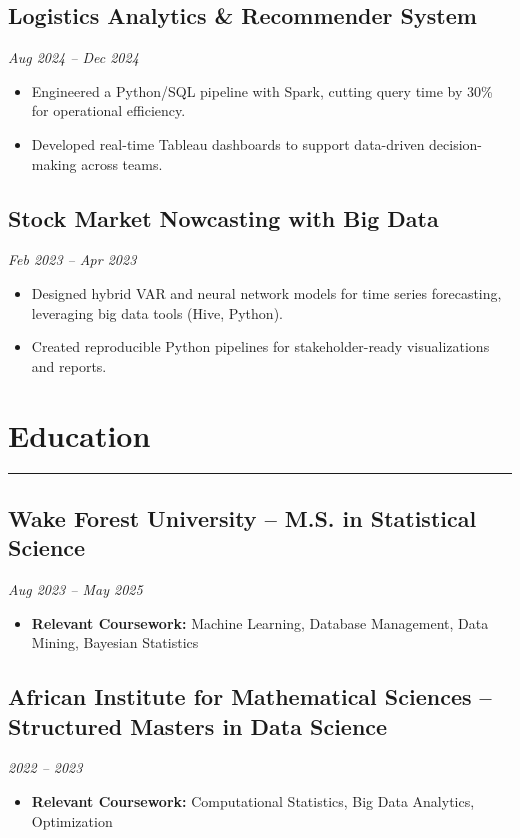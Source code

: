 \documentclass[a4paper,11pt]{article}
\begin{document}
\subsection*{Logistics Analytics \& Recommender System}
\textit{Aug 2024 – Dec 2024}
\begin{itemize}
    \item Engineered a Python/SQL pipeline with Spark, cutting query time by 30\% for operational efficiency.
    \item Developed real-time Tableau dashboards to support data-driven decision-making across teams.
\end{itemize}

\subsection*{Stock Market Nowcasting with Big Data}
\textit{Feb 2023 – Apr 2023}
\begin{itemize}
    \item Designed hybrid VAR and neural network models for time series forecasting, leveraging big data tools (Hive, Python).
    \item Created reproducible Python pipelines for stakeholder-ready visualizations and reports.
\end{itemize}

\section*{Education}
\hrule \vspace{2mm}
\subsection*{Wake Forest University – M.S. in Statistical Science}
\textit{Aug 2023 – May 2025}
\begin{itemize}
    \item \textbf{Relevant Coursework:} Machine Learning, Database Management, Data Mining, Bayesian Statistics
\end{itemize}

\subsection*{African Institute for Mathematical Sciences – Structured Masters in Data Science}
\textit{2022 – 2023}
\begin{itemize}
    \item \textbf{Relevant Coursework:} Computational Statistics, Big Data Analytics, Optimization
\end{itemize}
\end{document}
